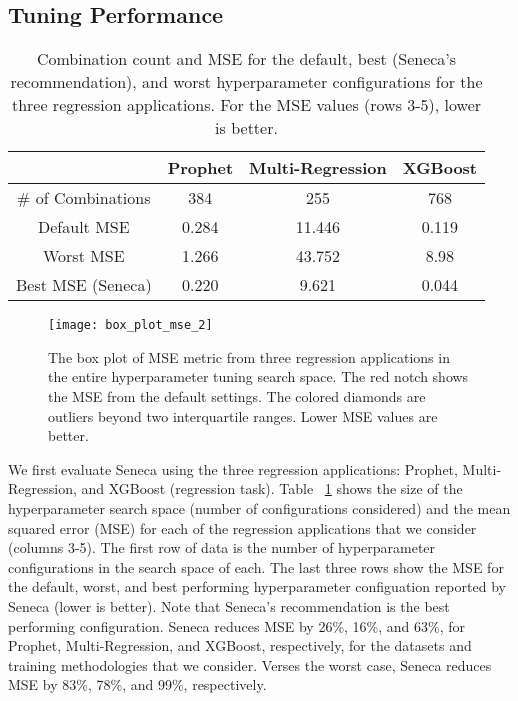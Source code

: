 \subsection{Tuning Performance}

\begin{table}
\centering
\begin{tabular}{|c|c|c|c|}
\hline
& Prophet & Multi-Regression & XGBoost\\
\hline
\# of Combinations & 384 & 255 & 768\\
\hline
\hline
Default MSE & 0.284 & 11.446 & 0.119 \\
\hline
Worst MSE & 1.266 & 43.752 & 8.98 \\
\hline
Best MSE (Seneca) & 0.220 & 9.621 & 0.044 \\
\hline
\end{tabular}
\caption{Combination count and MSE for the default, best (Seneca's recommendation), and worst hyperparameter configurations for the three regression applications. 
For the MSE  values (rows 3-5), lower is better.
\label{tab:mse}}
\end{table}

\begin{figure}[t] \centering 
\texttt{[image: box\_plot\_mse\_2]}
\caption{The box plot of MSE metric from three regression applications in the entire hyperparameter tuning search space. The red notch shows the MSE from the default settings. The colored diamonds are outliers beyond two interquartile ranges. Lower MSE values are better.
\label{fig:box_plot_mse}}
\vspace{-0.2in}
\end{figure}

We first evaluate Seneca using the three regression applications: 
Prophet, Multi-Regression, and XGBoost (regression task). 
Table ~\ref{tab:mse} shows the size of the hyperparameter search space (number of configurations
considered) and the mean squared error (MSE)
for each of the regression applications that we consider (columns 3-5).
The first row of data is 
 the number of hyperparameter configurations in the search space of each. 
The last three rows show the MSE for the default, worst, and best performing 
hyperparameter configuation reported by Seneca (lower is better).  
Note that Seneca's recommendation is the best performing configuration.
Seneca reduces MSE by 26\%, 16\%, and 63\%, for Prophet, Multi-Regression, and XGBoost,
respectively, for the datasets and training methodologies that we consider.
Verses the worst case, Seneca reduces MSE by 83\%, 78\%, and 99\%, respectively.


